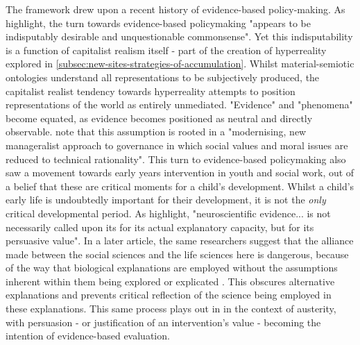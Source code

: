 The framework drew upon a recent history of evidence-based policy-making. As \citet[pp. 1-2]{edwards_early_2016} highlight, the turn towards evidence-based policymaking "appears to be indisputably desirable and unquestionable commonsense". Yet this indisputability is a function of capitalist realism itself - part of the creation of hyperreality explored in \ref{subsec:new-sites-strategies-of-accumulation}. Whilst material-semiotic ontologies understand all representations to be subjectively produced, the capitalist realist tendency towards hyperreality attempts to position representations of the world as entirely unmediated. "Evidence" and "phenomena" become equated, as evidence becomes positioned as neutral and directly observable. \citet[p. 1]{edwards_early_2016} note that this assumption is rooted in a "modernising, new manageralist approach to governance in which social values and moral issues are reduced to technical rationality". This turn to evidence-based policymaking also saw a movement towards early years intervention in youth and social work, out of a belief that these are critical moments for a child's development. Whilst a child's early life is undoubtedly important for their development, it is not the \emph{only} critical developmental period. As \citet[p. 8]{edwards_early_2016} highlight, "neuroscientific evidence... is not necessarily called upon its for its actual explanatory capacity, but for its persuasive value". In a later article, the same researchers suggest that the alliance made between the social sciences and the life sciences here is dangerous, because of the way that biological explanations are employed without the assumptions inherent within them being explored or explicated \citep{gillies_brave_2016}. This obscures alternative explanations and prevents critical reflection of the science being employed in these explanations. This same process plays out in in the context of austerity, with persuasion - or justification of an intervention's value - becoming the intention of evidence-based evaluation. 

